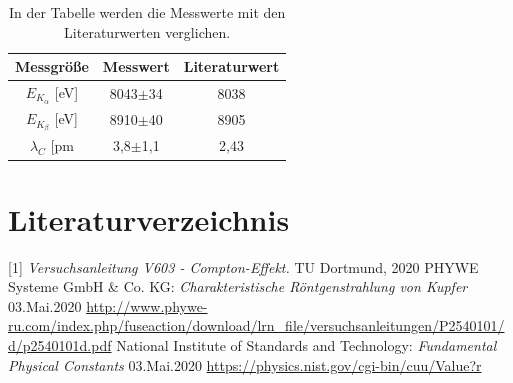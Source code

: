 \documentclass[titlepage = firstcover]{scrartcl}
\begin{document}
        \begin{table}[h]
            \centering
            \caption{In der Tabelle werden die Messwerte mit den Literaturwerten verglichen.}
            
            \begin{tabular}{c c c }
                \toprule
                {Messgröße} & {Messwert} & {Literaturwert} \\
                \midrule
                $E_{K_{\alpha}}$ [eV]& 8043$\pm$34 & 8038 \\
                $E_{K_{\beta}}$  [eV]& 8910$\pm$40 & 8905 \\
                $\lambda_C$      [pm}& 3,8$\pm$1,1 & 2,43 \\
                \bottomrule
            \end{tabular}
        \end{table}

    \newpage
    \section{Literaturverzeichnis}
            [1] \textit{Versuchsanleitung V603 - Compton-Effekt.} TU Dortmund, 2020 \newline
            [2] PHYWE Systeme GmbH \& Co. KG: \textit{Charakteristische Röntgenstrahlung von Kupfer} 03.Mai.2020
                \url{http://www.phywe-ru.com/index.php/fuseaction/download/lrn_file/versuchsanleitungen/P2540101/d/p2540101d.pdf} \newline
            [3] National Institute of Standards and Technology: \textit{Fundamental Physical Constants} 03.Mai.2020
                \url{https://physics.nist.gov/cgi-bin/cuu/Value?r}

    \newpage
    
\end{document}
